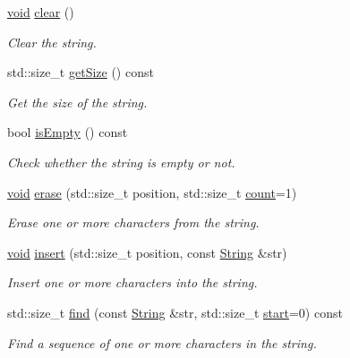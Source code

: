 \begin{DoxyCompactItemize}
\hyperlink{glutf90_8h_ac778d6f63f1aaf8ebda0ce6ac821b56e}{void} \hyperlink{classsf_1_1_string_a391c1b4950cbf3d3f8040cea73af2969}{clear} ()
\begin{DoxyCompactList}\small\item\em Clear the string. \end{DoxyCompactList}\item 
std\-::size\-\_\-t \hyperlink{classsf_1_1_string_a635d75c4cd830d5f639a41815dd0ce23}{get\-Size} () const 
\begin{DoxyCompactList}\small\item\em Get the size of the string. \end{DoxyCompactList}\item 
bool \hyperlink{classsf_1_1_string_a6c43f0cbe84cf17fa6ba93d58b75fcdc}{is\-Empty} () const 
\begin{DoxyCompactList}\small\item\em Check whether the string is empty or not. \end{DoxyCompactList}\item 
\hyperlink{glutf90_8h_ac778d6f63f1aaf8ebda0ce6ac821b56e}{void} \hyperlink{classsf_1_1_string_aaa78a0a46b3fbe200a4ccdedc326eb93}{erase} (std\-::size\-\_\-t position, std\-::size\-\_\-t \hyperlink{gl3_8h_a5b40aca7a9682963dd00a8f5aef0a901}{count}=1)
\begin{DoxyCompactList}\small\item\em Erase one or more characters from the string. \end{DoxyCompactList}\item 
\hyperlink{glutf90_8h_ac778d6f63f1aaf8ebda0ce6ac821b56e}{void} \hyperlink{classsf_1_1_string_ad0b1455deabf07af13ee79812e05fa02}{insert} (std\-::size\-\_\-t position, const \hyperlink{classsf_1_1_string}{String} \&str)
\begin{DoxyCompactList}\small\item\em Insert one or more characters into the string. \end{DoxyCompactList}\item 
std\-::size\-\_\-t \hyperlink{classsf_1_1_string_ae1fc8d6ced3b6082853f8013ea051b5c}{find} (const \hyperlink{classsf_1_1_string}{String} \&str, std\-::size\-\_\-t \hyperlink{gl3_8h_ac55adc720a3098c1b454d2a4647f4361}{start}=0) const 
\begin{DoxyCompactList}\small\item\em Find a sequence of one or more characters in the string. \end{DoxyCompactList}\item 

\end{DoxyCompactItemize}
